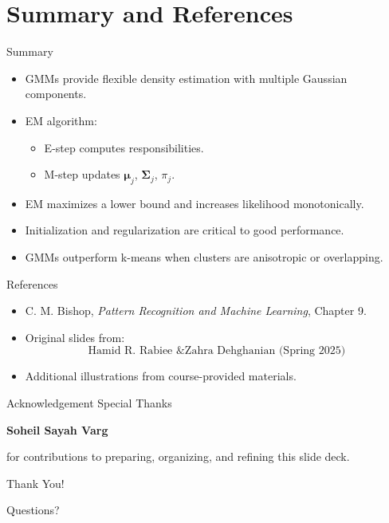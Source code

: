 \documentclass[serif, aspectratio=169]{beamer}
\begin{document}
\section{Summary and References}

\begin{frame}{Summary}
\begin{itemize}
    \item GMMs provide flexible density estimation with multiple Gaussian components.
    \item EM algorithm:
    \begin{itemize}
        \item E-step computes responsibilities.
        \item M-step updates $\mathbf{\mu}_j$, $\mathbf{\Sigma}_j$, $\pi_j$.
    \end{itemize}
    \item EM maximizes a lower bound and increases likelihood monotonically.
    \item Initialization and regularization are critical to good performance.
    \item GMMs outperform k-means when clusters are anisotropic or overlapping.
\end{itemize}
\end{frame}

\begin{frame}{References}
\begin{itemize}
    \item C. M. Bishop, \textit{Pattern Recognition and Machine Learning}, Chapter 9.
    \item Original slides from:
    \[
    \text{Hamid R. Rabiee \& Zahra Dehghanian (Spring 2025)}
    \]
    \item Additional illustrations from course-provided materials.
\end{itemize}
\end{frame}

\begin{frame}{Acknowledgement}
\centering
{\Large Special Thanks}

\vspace{1cm}

\Large
\textbf{Soheil Sayah Varg}

\vspace{1cm}

{\small for contributions to preparing, organizing, and refining this slide deck.}
\end{frame}

\begin{frame}
\centering
{\Huge Thank You!}

\vspace{0.5cm}
{\Large Questions?}
\end{frame}
\end{document}

